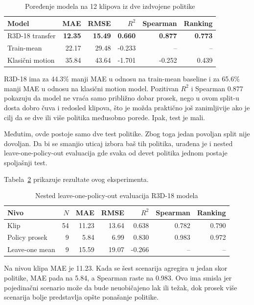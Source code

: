 \documentclass[12pt,a4paper]{report}
\begin{document}
\begin{table}[H]
  \centering
  \caption{Poređenje modela na 12 klipova iz dve izdvojene politike}
  \label{tab:metrics}
  \begin{tabular}{p{4.1cm}rrrrr}
    \toprule
    Model & MAE & RMSE & $R^2$ & Spearman & Ranking \\
    \midrule
    R3D-18 transfer & \textbf{12.35} & \textbf{15.49} & \textbf{0.660} & \textbf{0.877} & \textbf{0.773} \\
    Train-mean & 22.17 & 29.48 & -0.233 & -- & -- \\
    Klasični motion & 35.84 & 43.64 & -1.701 & -0.252 & 0.439 \\
    \bottomrule
  \end{tabular}
\end{table}

R3D-18 ima za 44.3\% manji MAE u odnosu na train-mean baseline i za 65.6\%
manji MAE u odnosu na klasični motion model. Pozitivan $R^2$ i Spearman 0.877
pokazuju da model ne vraća samo približno dobar prosek, nego u ovom split-u
dosta dobro čuva i redosled klipova, što je možda praktično još zanimljivije ako
je cilj da se dve ili više politika međusobno porede. Ipak, test je mali.

Međutim, ovde postoje samo dve test politike. Zbog toga jedan povoljan split
nije dovoljan. Da bi se smanjio uticaj izbora baš tih politika, urađena je i
nested leave-one-policy-out evaluacija gde svaka od devet politika jednom
postaje spoljašnji test.

Tabela~\ref{tab:nested-metrics} prikazuje rezultate ovog eksperimenta.

\begin{table}[H]
  \centering
  \caption{Nested leave-one-policy-out evaluacija R3D-18 modela}
  \label{tab:nested-metrics}
  \begin{tabular}{lrrrrrr}
    \toprule
    Nivo & $N$ & MAE & RMSE & $R^2$ & Spearman & Ranking \\
    \midrule
    Klip & 54 & 11.23 & 13.64 & 0.638 & 0.782 & 0.790 \\
    Policy prosek & 9 & 5.84 & 6.99 & 0.830 & 0.983 & 0.972 \\
    Leave-one mean & 9 & 15.59 & 19.07 & -0.266 & -- & -- \\
    \bottomrule
  \end{tabular}
\end{table}

Na nivou klipa MAE je 11.23. Kada se šest scenarija agregira u jedan skor
politike, MAE pada na 5.84, a Spearman raste na 0.983. Ovo ima smisla jer
pojedinačni scenario može da bude neuobičajeno lak ili težak, dok prosek više
scenarija bolje predstavlja opšte ponašanje politike.
\end{document}
